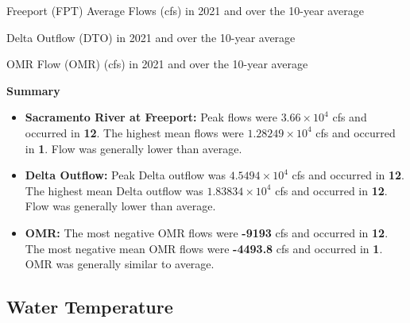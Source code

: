 \documentclass[
]{book}
\theoremstyle{definition}
\theoremstyle{definition}
\theoremstyle{definition}
\theoremstyle{definition}
\theoremstyle{remark}
\begin{document}
\label{fig:FPTflow-fig}Freeport (FPT) Average Flows (cfs) in 2021 and over the 10-year average

\label{fig:DTOflow-fig}Delta Outflow (DTO) in 2021 and over the 10-year average

\label{fig:OMRflow-fig}OMR Flow (OMR) (cfs) in 2021 and over the 10-year average

\textbf{Summary}

\begin{itemize}
\item
  \textbf{Sacramento River at Freeport:} Peak flows were \textbf{\ensuremath{3.66\times 10^{4}}} cfs and occurred in \textbf{12}. The highest mean flows were \textbf{\ensuremath{1.28249\times 10^{4}}} cfs and occurred in \textbf{1}. Flow was generally lower than average.
\item
  \textbf{Delta Outflow:} Peak Delta outflow was \textbf{\ensuremath{4.5494\times 10^{4}}} cfs and occurred in \textbf{12}. The highest mean Delta outflow was \textbf{\ensuremath{1.83834\times 10^{4}}} cfs and occurred in \textbf{12}. Flow was generally lower than average.
\item
  \textbf{OMR:} The most negative OMR flows were \textbf{-9193} cfs and occurred in \textbf{12}. The most negative mean OMR flows were \textbf{-4493.8} cfs and occurred in \textbf{1}. OMR was generally similar to average.
\end{itemize}

\hypertarget{water-temperature-3}{%
\subsection{Water Temperature}\label{water-temperature-3}}
\end{document}
